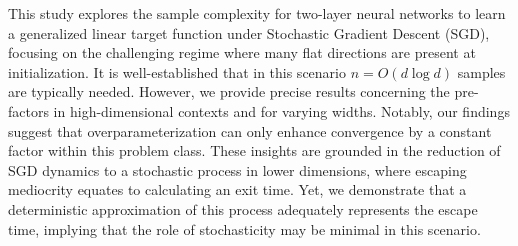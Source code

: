 This study explores the sample complexity for two-layer neural networks to learn a generalized linear target function under Stochastic Gradient Descent (SGD), focusing on the challenging regime where many flat directions are present at initialization. It is well-established that in this scenario $n=O(d \log d)$ samples are typically needed. However, we provide precise results concerning the pre-factors in high-dimensional contexts and for varying widths. Notably, our findings suggest that overparameterization can only enhance convergence by a constant factor within this problem class. These insights are grounded in the reduction of SGD dynamics to a stochastic process in lower dimensions, where escaping mediocrity equates to calculating an exit time. Yet, we demonstrate that a deterministic approximation of this process adequately represents the escape time, implying that the role of stochasticity may be minimal in this scenario.
